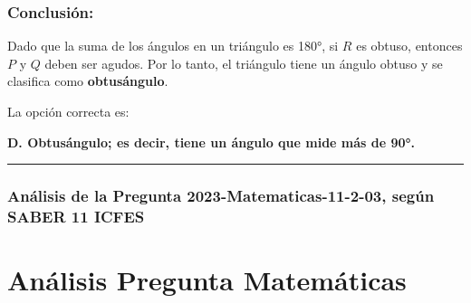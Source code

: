 \documentclass[
]{article}
\begin{document}
\subsubsection{Conclusión:}\label{conclusiuxf3n-1}

Dado que la suma de los ángulos en un triángulo es 180°, si \(R\) es
obtuso, entonces \(P\) y \(Q\) deben ser agudos. Por lo tanto, el
triángulo tiene un ángulo obtuso y se clasifica como
\textbf{obtusángulo}.

La opción correcta es:

\textbf{D. Obtusángulo; es decir, tiene un ángulo que mide más de 90°.}

\begin{center}\rule{0.5\linewidth}{0.5pt}\end{center}

\subsubsection{Análisis de la Pregunta 2023-Matematicas-11-2-03, según
SABER 11
ICFES}\label{anuxe1lisis-de-la-pregunta-2023-matematicas-11-2-03-seguxfan-saber-11-icfes}

\section{Análisis Pregunta
Matemáticas}\label{anuxe1lisis-pregunta-matemuxe1ticas}
\end{document}
